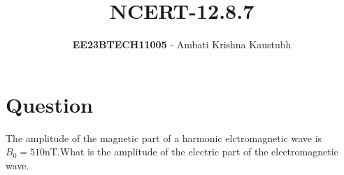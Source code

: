 \documentclass[journal,12pt,twocolumn]{IEEEtran}
\theoremstyle{remark}
\begin{document}
 

\title{NCERT-12.8.7}
\author{\textbf{EE23BTECH11005} - Ambati Krishna Kaustubh%
}
\maketitle
\newpage
\bigskip

\renewcommand{\thefigure}{\arabic{figure}}
\renewcommand{\thetable}{\arabic{table}}
\section*{Question}

The amplitude  of the magnetic part of a harmonic elctromagnetic wave
is $B_0=510$nT.What is the amplitude of the electric part of the electromagnetic wave. 
   
\solution
\end{document}
